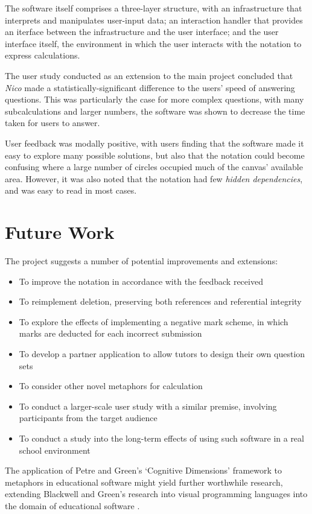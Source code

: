\documentclass[12pt,twoside,notitlepage,xetex]{report}
\begin{document}
The software itself comprises a three-layer structure, with an infrastructure that interprets and manipulates user-input data; an interaction handler that provides an iterface between the infrastructure and the user interface; and the user interface itself, the environment in which the user interacts with the notation to express calculations.

The user study conducted as an extension to the main project concluded that \emph{Nico} made a statistically-significant difference to the users' speed of answering questions.  This was particularly the case for more complex questions, with many subcalculations and larger numbers, the software was shown to decrease the time taken for users to answer.

User feedback was modally positive, with users finding that the software made it easy to explore many possible solutions, but also that the notation could become confusing where a large number of circles occupied much of the canvas' available area.  However, it was also noted that the notation had few \emph{hidden dependencies}, and was easy to read in most cases.

\section{Future Work}

The project suggests a number of potential improvements and extensions:
\begin{itemize}
\item To improve the notation in accordance with the feedback received
\item To reimplement deletion, preserving both references and referential integrity
\item To explore the effects of implementing a negative mark scheme, in which marks are deducted for each incorrect submission
\item To develop a partner application to allow tutors to design their own question sets
\item To consider other novel metaphors for calculation
\item To conduct a larger-scale user study with a similar premise, involving participants from the target audience
\item To conduct a study into the long-term effects of using such software in a real school environment
\end{itemize}

The application of Petre and Green's `Cognitive Dimensions' framework to metaphors in educational software might yield further worthwhile research, extending Blackwell and Green's research into visual programming languages into the domain of educational software \cite{Green1996} \cite{Blackwell1999}.
\end{document}
